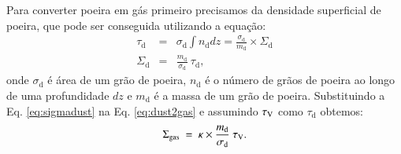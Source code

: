 Para converter poeira em gás primeiro precisamos da densidade superficial de poeira, que pode ser
conseguida utilizando a equação:
\begin{eqnarray}
	\tau_{\mathrm{d}} &=& \sigma_{\mathrm{d}} \int n_{\mathrm{d}} dz =
	\frac{\sigma_{\mathrm{d}}}{m_{\mathrm{d}}}\times\Sigma_{\mathrm{d}}
	\\
	\Sigma_{\mathrm{d}} &=& \frac{m_{\mathrm{d}}}{\sigma_{\mathrm{d}}}\ \tau_{\mathrm{d}},
	\label{eq:sigmadust}
\end{eqnarray}
\noindent onde $\sigma_{\mathrm{d}}$ é área de um grão de poeira, $n_{\mathrm{d}}$ é o número de
grãos de poeira ao longo de uma profundidade $dz$ e $m_{\mathrm{d}}$ é a massa de um grão de
poeira. Substituindo a Eq. \ref{eq:sigmadust} na Eq. \ref{eq:dust2gas} e assumindo $\tau_{\mathrm{V}}$ como
$\tau_{\mathrm{d}}$ obtemos:
\begin{equation}
	\Sigma_{\mathrm{gas}}\ =\ \kappa \times \frac{m_{\mathrm{d}}}{\sigma_{\mathrm{d}}}\ \tau_{\mathrm{V}}. 
	\label{eq:dust2gas_tauV}
\end{equation}

